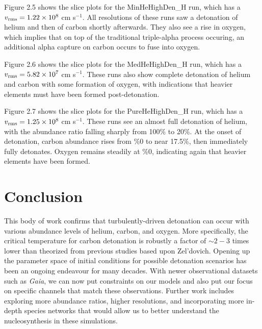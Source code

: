 \documentclass{aastex63}
\begin{document}
Figure 2.5 shows the slice plots for the MinHeHighDen\_H run, which has a $v_{\rm rms} = 1.22 \times 10^8$ cm s$^{-1}$. All resolutions of these runs saw a detonation of helium and then of carbon shortly afterwards. They also see a rise in oxygen, which implies that on top of the traditional triple-alpha process occuring, an additional alpha capture on carbon occurs to fuse into oxygen.

Figure 2.6 shows the slice plots for the MedHeHighDen\_H run, which has a $v_{\rm rms} = 5.82 \times 10^7$ cm s$^{-1}$. These runs also show complete detonation of helium and carbon with some formation of oxygen, with indications that heavier elements must have been formed post-detonation.

Figure 2.7 shows the slice plots for the PureHeHighDen\_H run, which has a $v_{\rm rms} = 1.25 \times 10^8$ cm s$^{-1}$. These runs see an almost full detonation of helium, with the abundance ratio falling sharply from 100\% to 20\%. At the onset of detonation, carbon abundance rises from \%0 to near 17.5\%, then immediately fully detonates. Oxygen remains steadily at \%0, indicating again that heavier elements have been formed.

\section{Conclusion}

This body of work confirms that turbulently-driven detonation can occur with various abundance levels of helium, carbon, and oxygen. More specifically, the critical temperature for carbon detonation is robustly a factor of $\sim 2-3$ times lower than theorized from previous studies based upon Zel'dovich. Opening up the parameter space of initial conditions for possible detonation scenarios has been an ongoing endeavour for many decades. With newer observational datasets such as \textit{Gaia}, we can now put constraints on our models and also put our focus on specific channels that match these observations. Further work includes exploring more abundance ratios, higher resolutions, and incorporating more in-depth species networks that would allow us to better understand the nucleosynthesis in these simulations.
\end{document}
